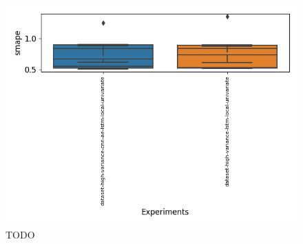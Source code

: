   \begin{figure}[h!]
    \centering
    \includegraphics[width=\textwidth]{./figs/results/boxplot/smape-dataset_high_variance.png}
    \hfill
    \caption{TODO}
    \label{fig:results-smape-dataset-high-variance}
  \end{figure}
\fi
